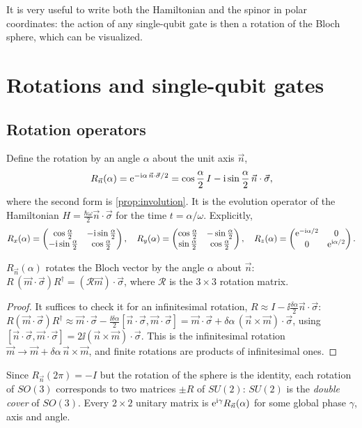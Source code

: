 \begin{keypoint}
It is very useful to write both the Hamiltonian and the spinor in polar coordinates: the action of any single-qubit gate is then a rotation
of the Bloch sphere, which can be visualized.
\end{keypoint}

\section{Rotations and single-qubit gates}
\subsection{Rotation operators}
Define the rotation by an angle $\alpha$ about the unit axis $\vec n$,
\begin{equation}\label{eq:rotation}
  R_{\vec n}(\alpha)=\mathrm e^{-\mathrm i\alpha\,\vec n\cdot\vec\sigma/2}=\cos\frac\alpha2\,I-\mathrm i\sin\frac\alpha2\,\vec n\cdot\vec\sigma,
\end{equation}
where the second form is \cref{prop:involution}. It is the evolution operator of the Hamiltonian $H=\frac{\hbar\omega}2\vec n\cdot\vec\sigma$ for
the time $t=\alpha/\omega$. Explicitly,
\begin{equation}
  R_x(\alpha)=\begin{pmatrix}\cos\frac\alpha2&-\mathrm i\sin\frac\alpha2\\-\mathrm i\sin\frac\alpha2&\cos\frac\alpha2\end{pmatrix},\quad
  R_y(\alpha)=\begin{pmatrix}\cos\frac\alpha2&-\sin\frac\alpha2\\ \sin\frac\alpha2&\cos\frac\alpha2\end{pmatrix},\quad
  R_z(\alpha)=\begin{pmatrix}\mathrm e^{-\mathrm i\alpha/2}&0\\0&\mathrm e^{\mathrm i\alpha/2}\end{pmatrix}.
\end{equation}
\begin{proposition}
$R_{\vec n}(\alpha)$ rotates the Bloch vector by the angle $\alpha$ about $\vec n$: $R\,(\vec m\cdot\vec\sigma)R^\dagger=(\mathcal R\vec m)\cdot\vec\sigma$,
where $\mathcal R$ is the $3\times3$ rotation matrix.
\end{proposition}
\begin{proof}
It suffices to check it for an infinitesimal rotation, $R\approx I-\ii\frac{\delta\alpha}2\vec n\cdot\vec\sigma$:
$R(\vec m\cdot\vec\sigma)R^\dagger\approx\vec m\cdot\vec\sigma-\frac{\ii\delta\alpha}2[\vec n\cdot\vec\sigma,\vec m\cdot\vec\sigma]
=\vec m\cdot\vec\sigma+\delta\alpha\,(\vec n\times\vec m)\cdot\vec\sigma$, using $[\vec n\cdot\vec\sigma,\vec m\cdot\vec\sigma]=2\ii(\vec n\times\vec m)\cdot\vec\sigma$.
This is the infinitesimal rotation $\vec m\to\vec m+\delta\alpha\,\vec n\times\vec m$, and finite rotations are products of infinitesimal ones.
\end{proof}
Since $R_{\vec n}(2\pi)=-I$ but the rotation of the sphere is the identity, each rotation of $SO(3)$ corresponds to two matrices $\pm R$ of $SU(2)$:
$SU(2)$ is the \emph{double cover} of $SO(3)$. Every $2\times2$ unitary matrix is $\mathrm e^{\mathrm i\gamma}R_{\vec n}(\alpha)$ for some global phase $\gamma$, axis and angle.

